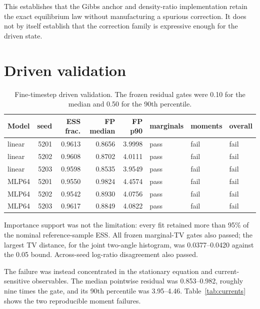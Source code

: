 \documentclass[11pt]{article}
\begin{document}
This establishes that the Gibbs anchor and density-ratio implementation retain
the exact equilibrium law without manufacturing a spurious correction.  It
does not by itself establish that the correction family is expressive enough
for the driven state.

\section{Driven validation}
\begin{table}[ht]
\centering
\small
\caption{Fine-timestep driven validation.  The frozen residual gates were 0.10
for the median and 0.50 for the 90th percentile.}
\begin{tabular}{lrrrrlll}
\toprule
Model & seed & ESS frac. & FP median & FP p90 & marginals & moments & overall\\
\midrule
linear & 5201 & 0.9613 & 0.8656 & 3.9998 & pass & fail & fail\\
linear & 5202 & 0.9608 & 0.8702 & 4.0111 & pass & fail & fail\\
linear & 5203 & 0.9598 & 0.8535 & 3.9549 & pass & fail & fail\\
MLP64 & 5201 & 0.9550 & 0.9824 & 4.4574 & pass & fail & fail\\
MLP64 & 5202 & 0.9542 & 0.8930 & 4.0756 & pass & fail & fail\\
MLP64 & 5203 & 0.9617 & 0.8849 & 4.0822 & pass & fail & fail\\
\bottomrule
\end{tabular}
\end{table}

Importance support was not the limitation: every fit retained more than 95\%
of the nominal reference-sample ESS.  All frozen marginal-TV gates also passed;
the largest TV distance, for the joint two-angle histogram, was 0.0377--0.0420
against the 0.05 bound.  Across-seed log-ratio disagreement also passed.

The failure was instead concentrated in the stationary equation and
current-sensitive observables.  The median pointwise residual was
0.853--0.982, roughly nine times the gate, and its 90th percentile was
3.95--4.46.  Table~\ref{tab:currents} shows the two reproducible moment
failures.
\end{document}
